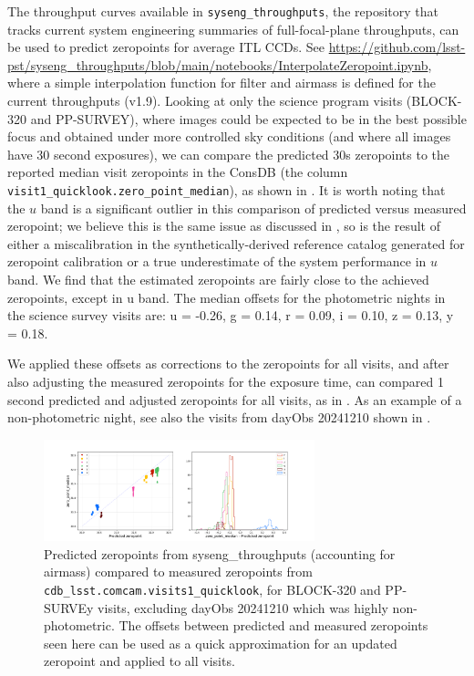 The throughput curves available in \texttt{syseng\_throughputs}, the repository that tracks current system engineering summaries of full-focal-plane throughputs, can be used to predict zeropoints for average ITL CCDs. See \url{https://github.com/lsst-pst/syseng\_throughputs/blob/main/notebooks/InterpolateZeropoint.ipynb}, where a simple interpolation function for filter and airmass is defined for the current throughputs (v1.9).  Looking at only the science program visits (BLOCK-320 and PP-SURVEY), where images could be expected to be in the best possible focus and obtained under more controlled sky conditions (and where all images have 30 second exposures), we can compare the predicted 30s zeropoints to the reported median visit zeropoints in the ConsDB (the column \texttt{visit1\_quicklook.zero\_point\_median}), as shown in . It is worth noting that the $u$ band is a significant outlier in this comparison of predicted versus measured zeropoint; we believe this is the same issue as discussed in , so is the result of either a miscalibration in the synthetically-derived reference catalog generated for zeropoint calibration or a true underestimate of the system performance in $u$ band.  We find that the estimated zeropoints are fairly close to the achieved zeropoints, except in u band. The median offsets for the photometric nights in the science survey visits are:  u = -0.26, g = 0.14, r = 0.09, i = 0.10, z = 0.13, y = 0.18. 

We applied these offsets as corrections to the zeropoints for all visits, and after also adjusting the measured zeropoints for the exposure time, can compared 1 second predicted and adjusted zeropoints for all visits, as in .  As an example of a non-photometric night, see also the visits from dayObs 20241210 shown in . 

\begin{figure}
    \centering
    \includegraphics[width=0.7\textwidth]{sp/zeropoints.png}
    \caption{Predicted zeropoints from syseng\_throughputs (accounting for airmass) compared to measured zeropoints from \texttt{cdb\_lsst.comcam.visits1\_quicklook},  for BLOCK-320 and PP-SURVEy visits, excluding dayObs 20241210 which was highly non-photometric. The offsets between predicted and measured zeropoints seen here can be used as a quick approximation for an updated zeropoint and applied to all visits.}
    \label{fig:zeropoints}
    \end{figure}


